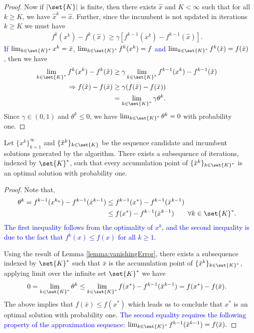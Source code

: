 \documentclass[11pt]{article}
\begin{document}
\begin{proof}
Now if $|\set{K}|$ is finite, then there exists $\hat{x}$ and $K < \infty$ such that for all $k \geq K$, we have $\hat{x}^k = \hat{x}$. Further, since the incumbent is not updated in iterations $k \geq K$ we must have 
\begin{align*}
	f^{k}(x^k) - f^{k}(\hat{x}) \geq \gamma [f^{k-1}(x^k) - f^{k-1}(\hat{x})].
\end{align*}
\textcolor{blue}{If $\lim_{k \in \set{K}^*} x^k = \bar{x}$, $\lim_{k \in \set{K}^*} f^k(x^k) = f$ and $\lim_{k \in \set{K}^*} f^k(\hat{x}) = f(\hat{x})$}, then we have 
\begin{align*}
	\lim_{k \in \set{K}^*} f^{k}(x^k) - f^{k}(\hat{x}) &\geq \gamma \lim_{k \in \set{K}^*} f^{k-1}(x^k) - f^{k-1}(\hat{x}) \\
	\Rightarrow f(\hat{x}) - f(\bar{x}) &\geq \gamma(f(\hat{x}) - f(\bar{x})) \\
	&= \lim_{k \in \set{K}^*} \gamma\theta^k.
\end{align*}
Since $\gamma \in (0,1)$ and $\theta^k \leq 0$, we have $\lim_{k \in \set{K}^*} \theta^k = 0$ with probability one.
\end{proof}

\begin{theorem}
Let $\{x^k\}_{k=1}^\infty$ and $\{\hat{x}^k\}_{k \in \set{K}}$ be the sequence candidate and incumbent solutions generated by the algorithm. There exists a subsequence of iterations, indexed by $\set{K}^*$, such that every accumulation point of $\{\hat{x}^k\}_{k \in \set{K}^*}$ is an optimal solution with probability one.
\end{theorem}
\begin{proof}
Note that,
\begin{align*}
    \theta^{k} = f^{{k}-1}(x^{k_n}) - f^{{k}-1}(\hat{x}^{{k}-1})
    &\leq f^{{k}-1}(x^*) - f^{{k}-1}(\hat{x}^{{k}-1}) \\
    &\leq f(x^*) - f^{{k}-1}(\hat{x}^{{k}-1})
    \qquad \forall k \in \set{K}^*.
\end{align*}
\textcolor{blue}{The first inequality follows from the optimality of $x^{k}$, and the second inequality is due to the fact that $f^k(x) \leq f(x)$ for all $k \geq 1$.}

Using the result of Lemma \ref{lemma:vanishingError}, there exists a subsequence indexed by $\set{K}^*$ such that $\bar{x}$ is the accumulation point of $\{\hat{x}^{k}\}_{k \in \set{K}^*}$, applying limit over the infinite set $\set{K}^*$ we have 
\begin{align*}
    0 = \lim_{k \in \set{K}^*} \theta^{k} \leq \lim_{k \in \set{K}^*} f(x^*) - f^{{k}-1}(\bar{x}^{{k}-1}) = f(x^*) - f(\bar{x}).
\end{align*}
The above implies that $f(\bar{x}) \leq f(x^*)$ which leads us to conclude that $x^*$ is an optimal solution with probability one. \textcolor{blue}{The second equality requires the following property of the approximation sequence: $\lim_{k \in \set{K}^*} f^{k-1}(\hat{x}^{k-1}) = f(\bar{x}).$}
\end{proof}
\end{document}
